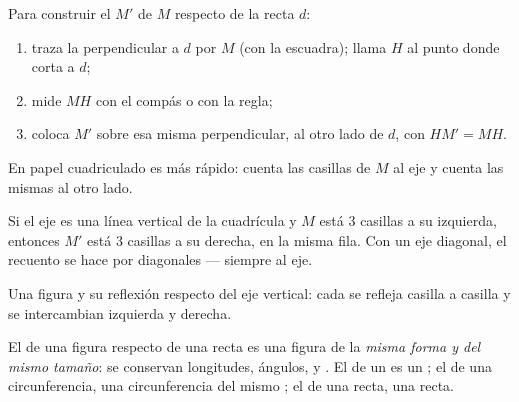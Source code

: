 \begin{method}\label{met:g6:symmetry:construct}
Para construir el  $M'$ de $M$ respecto de la recta $d$:
\begin{enumerate}
  \item traza la perpendicular a $d$ por $M$ (con la escuadra); llama
        $H$ al punto donde corta a $d$;
  \item mide $MH$ con el compás o con la regla;
  \item coloca $M'$ sobre esa misma perpendicular, al otro lado de $d$,
        con $HM' = MH$.
\end{enumerate}
En papel cuadriculado es más rápido: cuenta las casillas de $M$ al eje y
cuenta las mismas al otro lado.
\end{method}

\begin{example}[En la cuadrícula]\label{ex:g6:symmetry:grid}
Si el eje es una línea vertical de la cuadrícula y $M$ está $3$ casillas a su izquierda,
entonces $M'$ está $3$ casillas a su derecha, en la misma fila. Con un eje
diagonal, el recuento se hace por diagonales --- siempre  al
eje.
\end{example}

\begin{omfigure}

{\small Una figura y su reflexión respecto del eje vertical: cada
 se refleja casilla a casilla y se intercambian izquierda y derecha.}
\end{omfigure}

\begin{proposition}\label{prop:g6:symmetry:preserved}
El  de una figura respecto de una recta es una figura de la \emph{misma
forma y del mismo tamaño}: se conservan longitudes, ángulos,  y .
El  de un  es un ; el de una circunferencia, una
circunferencia del mismo ; el de una recta, una recta.
\end{proposition}
\admitted


